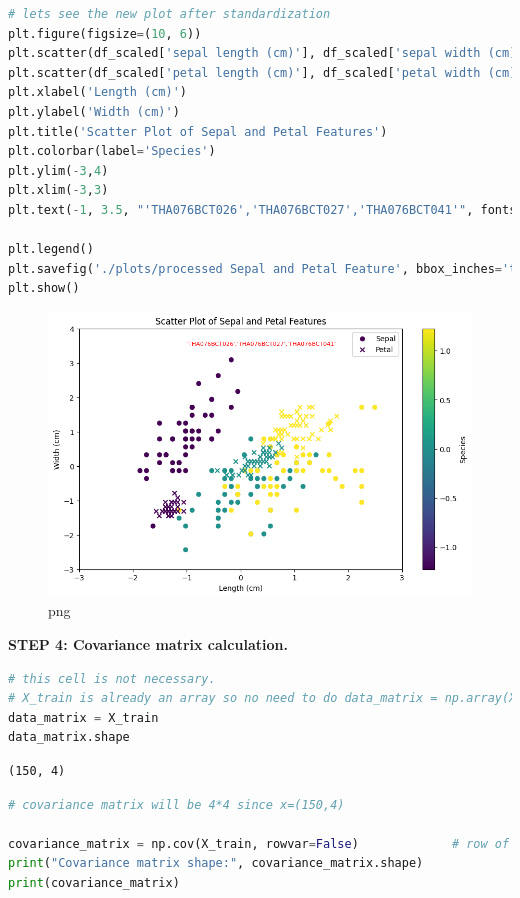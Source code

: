 \documentclass[
]{article}
\begin{document}
\begin{lstlisting}[language=Python]
# lets see the new plot after standardization
plt.figure(figsize=(10, 6))
plt.scatter(df_scaled['sepal length (cm)'], df_scaled['sepal width (cm)'], c=df_scaled['target'], label='Sepal')
plt.scatter(df_scaled['petal length (cm)'], df_scaled['petal width (cm)'], c=df_scaled['target'], marker='x', label='Petal')
plt.xlabel('Length (cm)')
plt.ylabel('Width (cm)')
plt.title('Scatter Plot of Sepal and Petal Features')
plt.colorbar(label='Species')
plt.ylim(-3,4)
plt.xlim(-3,3)
plt.text(-1, 3.5, "'THA076BCT026','THA076BCT027','THA076BCT041'", fontsize=8,color='red')

plt.legend()
plt.savefig('./plots/processed Sepal and Petal Feature', bbox_inches='tight')
plt.show()
\end{lstlisting}

\begin{figure}
\centering
\includegraphics{PCA on IRIS_files/PCA on IRIS_18_0.png}
\caption{png}
\end{figure}

\textbf{STEP 4: Covariance matrix calculation.}

\begin{lstlisting}[language=Python]
# this cell is not necessary.
# X_train is already an array so no need to do data_matrix = np.array(X)
data_matrix = X_train
data_matrix.shape
\end{lstlisting}

\begin{lstlisting}
(150, 4)
\end{lstlisting}

\begin{lstlisting}[language=Python]
# covariance matrix will be 4*4 since x=(150,4)

covariance_matrix = np.cov(X_train, rowvar=False)             # row of X_train != variable(so column of X_train means variable, and rows means observation)
print("Covariance matrix shape:", covariance_matrix.shape)
print(covariance_matrix)
\end{lstlisting}
\end{document}
